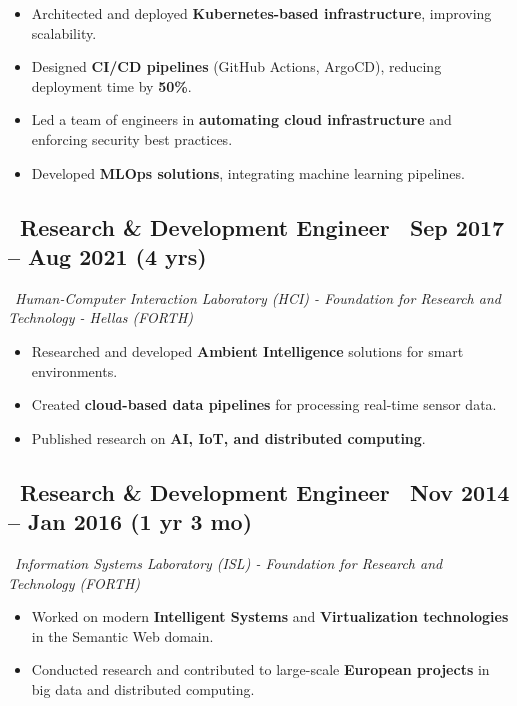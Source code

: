 \documentclass[a4paper,10pt]{article}
\begin{document}
\vspace{1pt}
\begin{adjustwidth}{1em}{1em} %
    \begin{itemize}[left=0pt]
        \item Architected and deployed \textbf{Kubernetes-based infrastructure}, improving scalability.
        \item Designed \textbf{CI/CD pipelines} (GitHub Actions, ArgoCD), reducing deployment time by \textbf{50\%}.
        \item Led a team of engineers in \textbf{automating cloud infrastructure} and enforcing security best practices.
        \item Developed \textbf{MLOps solutions}, integrating machine learning pipelines.
    \end{itemize}
\end{adjustwidth}

\vspace{1pt}

\subsection*{\faBriefcase\ \textbf{Research \& Development Engineer} \hfill \faCalendar\ Sep 2017 – Aug 2021 (4 yrs)}
\faBuilding\ \textit{Human-Computer Interaction Laboratory (HCI) - Foundation for Research and Technology - Hellas (FORTH)}
\vspace{1pt}
\begin{adjustwidth}{1em}{1em}
    \begin{itemize}[left=0pt]
        \item Researched and developed \textbf{Ambient Intelligence} solutions for smart environments.
        \item Created \textbf{cloud-based data pipelines} for processing real-time sensor data.
        \item Published research on \textbf{AI, IoT, and distributed computing}.
    \end{itemize}
\end{adjustwidth}

\vspace{1pt}

\subsection*{\faBriefcase\ \textbf{Research \& Development Engineer} \hfill \faCalendar\ Nov 2014 – Jan 2016 (1 yr 3 mo)}
\faBuilding\ \textit{Information Systems Laboratory (ISL) - Foundation for Research and Technology (FORTH)}  
\vspace{1pt}
\begin{adjustwidth}{1em}{1em}
    \begin{itemize}[left=0pt]
        \item Worked on modern \textbf{Intelligent Systems} and \textbf{Virtualization technologies} in the Semantic Web domain.
        \item Conducted research and contributed to large-scale \textbf{European projects} in big data and distributed computing.
    \end{itemize}
\end{adjustwidth}
\end{document}
